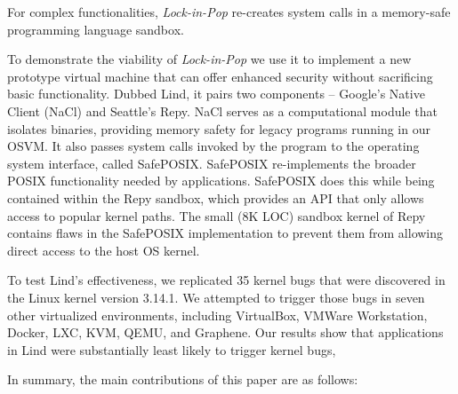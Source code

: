 For complex functionalities,  \emph{Lock-in-Pop} re-creates system calls in
a memory-safe programming language sandbox.

To demonstrate the viability of \emph{Lock-in-Pop} we use it to implement a new
prototype virtual machine that can offer enhanced security without sacrificing
 basic functionality. Dubbed Lind, it pairs two components -- Google's Native Client
(NaCl) and Seattle's Repy. NaCl serves as a computational module that isolates
binaries, providing memory
safety for legacy programs running in our OSVM. It also passes system calls
invoked by the program to the operating system interface, called SafePOSIX. 
SafePOSIX re-implements the broader POSIX functionality needed by applications.
SafePOSIX does this while being contained within the Repy sandbox, which
provides an API that only allows access to popular kernel paths.  The small 
(8K LOC) sandbox kernel of Repy contains flaws in the SafePOSIX implementation
to prevent them from allowing direct access to the host OS kernel.


To test Lind's effectiveness, we replicated 35 kernel bugs that were
discovered in the Linux kernel version 3.14.1.  We attempted to trigger those
bugs in seven other virtualized environments,
including VirtualBox, VMWare Workstation, Docker, LXC, KVM, QEMU, and Graphene.
Our results show that applications in Lind were substantially least likely to trigger 
kernel bugs,


In summary, the main contributions of this paper are as follows:

